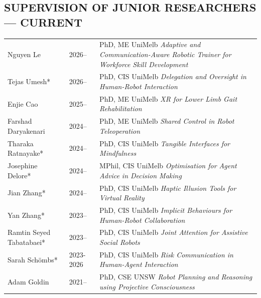 %

\subsection{SUPERVISION OF JUNIOR RESEARCHERS — CURRENT}
\vspace{2pt}

\noindent
\begin{tabularx}{\textwidth}{@{}llX@{}}
Nguyen Le               & 2026--      & PhD, ME UniMelb \quad \textit{Adaptive and Communication-Aware Robotic Trainer for Workforce Skill Development} \\[2pt]
Tejas Umesh*               & 2026--      & PhD, CIS UniMelb \quad \textit{Delegation and Oversight in Human-Robot Interaction} \\[2pt]
Enjie Cao               & 2025--      & PhD, ME UniMelb \quad \textit{XR for Lower Limb Gait Rehabilitation} \\[2pt]
Farshad Daryakenari     & 2024--      & PhD, ME UniMelb \quad \textit{Shared Control in Robot Teleoperation} \\[2pt]
Tharaka Ratnayake*      & 2024--      & PhD, CIS UniMelb \quad \textit{Tangible Interfaces for Mindfulness} \\[2pt]
Josephine Delore*       & 2024--      & MPhil, CIS UniMelb \quad \textit{Optimisation for Agent Advice in Decision Making} \\[2pt]
Jian Zhang*             & 2024--      & PhD, CIS UniMelb \quad \textit{Haptic Illusion Tools for Virtual Reality} \\[2pt]
Yan Zhang*              & 2023--      & PhD, CIS UniMelb \quad \textit{Implicit Behaviours for Human-Robot Collaboration} \\[2pt]
Ramtin Seyed Tabatabaei* & 2023--     & PhD, CIS UniMelb \quad \textit{Joint Attention for Assistive Social Robots} \\[2pt]

Sarah Schömbs*          & 2023- 2026      & PhD, CIS UniMelb \quad \textit{Risk Communication in Human-Agent Interaction} \\[2pt]
Adam Goldin             & 2021--      & PhD, CSE UNSW \quad \textit{Robot Planning and Reasoning using Projective Consciousness} \\
\end{tabularx}

